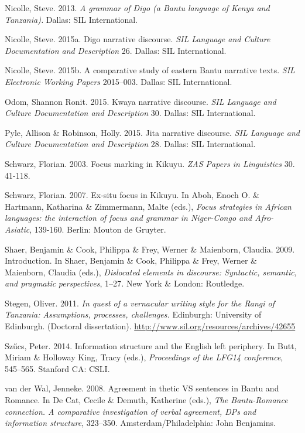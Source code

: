 \documentclass[output=paper]{langsci/langscibook}
\begin{document}
\begin{styleLangSciTranslation}
\begin{styleLangSciTranslation}
\begin{styleLangSciTranslation}
Nicolle, Steve. 2013. \textit{A grammar of Digo (a Bantu language of Kenya and Tanzania).} Dallas: SIL International.

Nicolle, Steve. 2015a. Digo narrative discourse. \textit{SIL Language and Culture Documentation and Description }26. Dallas: SIL International.

Nicolle, Steve. 2015b. A comparative study of eastern Bantu narrative texts. \textit{SIL Electronic Working Papers }2015–003. Dallas: SIL International.

Odom, Shannon Ronit. 2015. Kwaya narrative discourse. \textit{SIL Language and Culture Documentation and Description} 30. Dallas: SIL International.

Pyle, Allison \& Robinson, Holly. 2015. Jita narrative discourse. \textit{SIL Language and C}\textit{ulture Documentation and Description} 28. Dallas: SIL International.

Schwarz, Florian. 2003. Focus marking in Kikuyu. \textit{ZAS Papers in Linguistics} 30. 41-118.

Schwarz, Florian. 2007. Ex-situ focus in Kikuyu. In Aboh, Enoch O. \& Hartmann, Katharina \& Zimmermann, Malte (eds.), \textit{Focus strategies in African languages: the interaction of focus and grammar in Niger-Congo and Afro-Asiatic}, 139-160. Berlin: Mouton de Gruyter.

Shaer, Benjamin \& Cook, Philippa \& Frey, Werner \& Maienborn, Claudia. 2009. Introduction. In Shaer, Benjamin \& Cook, Philippa \& Frey, Werner \& Maienborn, Claudia (eds.), \textit{Dislocated elements in discourse: Syntactic, semantic, and pragmatic}\textit{ perspectives}, 1–27\textit{.} New York \& London: Routledge.

Stegen, Oliver. 2011. \textit{In quest of a vernacular writing style for the Rangi of Tanzania: Assumptions, processes, challenges.} Edinburgh: University of Edinburgh. (Doctoral dissertation). \url{http://www.sil.org/resources/archives/42655}

Szűcs, Peter. 2014. Information structure and the English left periphery. In Butt, Miriam \& Holloway King, Tracy (eds.), \textit{Proceedings of the LFG14 conference}, 545–565. Stanford CA: CSLI.

van der Wal, Jenneke. 2008. Agreement in thetic VS sentences in Bantu and Romance. In De Cat, Cecile \& Demuth, Katherine (eds.), \textit{The Bantu-Romance connection. A comparative investigation of verbal agreement, DPs and information structure}, 323–350. Amsterdam/Philadelphia: John Benjamins.


\end{styleLangSciTranslation}
\end{styleLangSciTranslation}
\end{styleLangSciTranslation}
\end{document}
